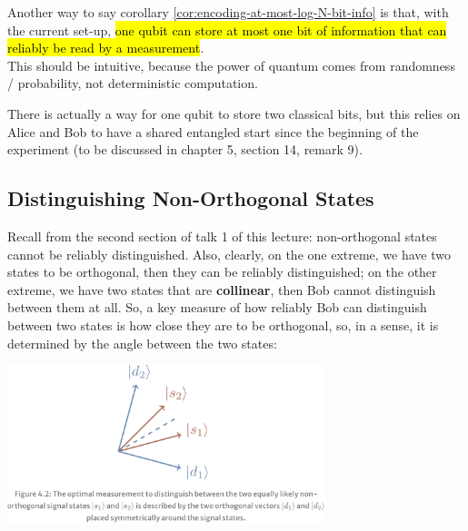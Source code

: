 \documentclass[12pt]{article}
\begin{document}
\begin{remark}
Another way to say corollary \ref{cor:encoding-at-most-log-N-bit-info} is that, with the current set-up, \hl{one qubit can store at most one bit of information that can reliably be read by a measurement}.\\

\noindent This should be intuitive, because the power of quantum comes from randomness / probability, not deterministic computation.
\end{remark}

\begin{remark}
There is actually a way for one qubit to store two classical bits, but this relies on Alice and Bob to have a shared entangled start since the beginning of the experiment (to be discussed in chapter 5, section 14, remark 9).
\end{remark}

\subsection{Distinguishing Non-Orthogonal States}
\begin{idea}\label{idea:differentiage-non-orthogonal-signals-how?}
Recall from the second section of talk 1 of this lecture: non-orthogonal states cannot be reliably distinguished. Also, clearly, on the one extreme, we have two states to be orthogonal, then they can be reliably distinguished; on the other extreme, we have two states that are \textbf{collinear}, then Bob cannot distinguish between them at all. So, a key measure of how reliably Bob can distinguish between two states is how close they are to be orthogonal, so, in a sense, it is determined by the angle between the two states:
\begin{center}
    \includegraphics[width = 25em]{images/2.jpg}
\end{center}
\end{idea}
\end{document}
